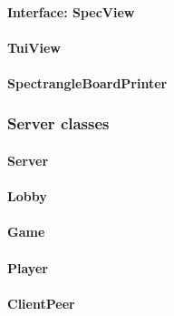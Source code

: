 \documentclass[12pt, letterpaper]{article}
\begin{document}
    \paragraph{Interface: SpecView}

    \paragraph{TuiView}

    \paragraph{SpectrangleBoardPrinter}



    \subsubsection{Server classes}


    \paragraph{Server}

    \paragraph{Lobby}

    \paragraph{Game}

    \paragraph{Player}

    \paragraph{ClientPeer}

\end{document}
